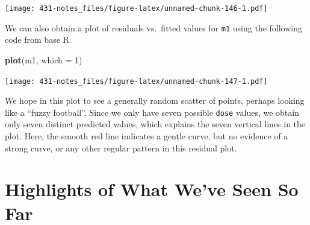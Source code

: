 \documentclass[
]{book}
\newenvironment{Shaded}{\begin{snugshade}}{\end{snugshade}}
\newcommand{\DataTypeTok}[1]{\textcolor[rgb]{0.13,0.29,0.53}{#1}}
\newcommand{\DecValTok}[1]{\textcolor[rgb]{0.00,0.00,0.81}{#1}}
\newcommand{\KeywordTok}[1]{\textcolor[rgb]{0.13,0.29,0.53}{\textbf{#1}}}
\newcommand{\NormalTok}[1]{#1}
\newcommand{\OperatorTok}[1]{\textcolor[rgb]{0.81,0.36,0.00}{\textbf{#1}}}
\newcommand{\StringTok}[1]{\textcolor[rgb]{0.31,0.60,0.02}{#1}}
\begin{document}
\begin{Shaded}
\end{Shaded}

\texttt{[image: 431-notes\_files/figure-latex/unnamed-chunk-146-1.pdf]}

We can also obtain a plot of residuals vs.~fitted values for \texttt{m1} using the following code from base R.

\begin{Shaded}
\begin{Highlighting}[]
\KeywordTok{plot}\NormalTok{(m1, }\DataTypeTok{which =} \DecValTok{1}\NormalTok{)}
\end{Highlighting}
\end{Shaded}

\texttt{[image: 431-notes\_files/figure-latex/unnamed-chunk-147-1.pdf]}

We hope in this plot to see a generally random scatter of points, perhaps looking like a ``fuzzy football''. Since we only have seven possible \texttt{dose} values, we obtain only seven distinct predicted values, which explains the seven vertical lines in the plot. Here, the smooth red line indicates a gentle curve, but no evidence of a strong curve, or any other regular pattern in this residual plot.

\hypertarget{highlights-of-what-weve-seen-so-far}{%
\chapter{Highlights of What We've Seen So Far}\label{highlights-of-what-weve-seen-so-far}}
\end{document}
